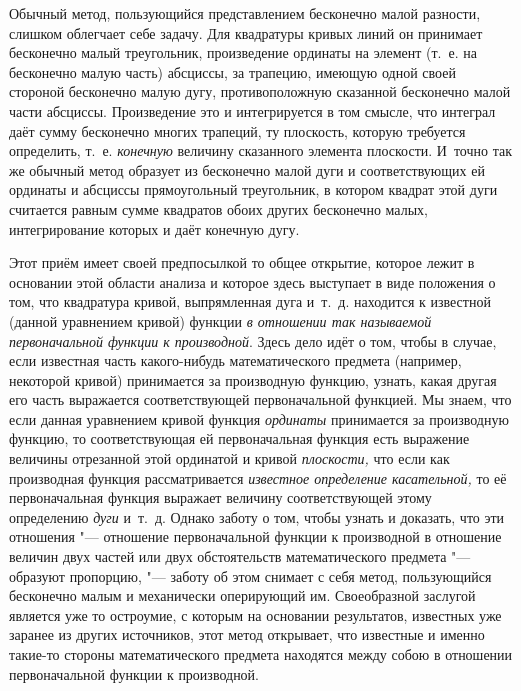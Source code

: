 Обычный метод, пользующийся представлением бесконечно малой разности, слишком
облегчает себе задачу. Для квадратуры кривых линий он принимает бесконечно
малый треугольник, произведение ординаты на элемент (т.~е. на бесконечно малую
часть) абсциссы, за трапецию, имеющую одной своей стороной бесконечно малую
дугу, противоположную сказанной бесконечно малой части абсциссы. Произведение
это и интегрируется в том смысле, что интеграл даёт сумму бесконечно многих
трапеций, ту плоскость, которую требуется определить, т.~е. {\em конечную}
величину сказанного элемента плоскости. И~точно так же обычный метод образует
из бесконечно малой дуги и соответствующих ей ординаты и абсциссы прямоугольный
треугольник, в котором квадрат этой дуги считается равным сумме квадратов обоих
других бесконечно малых, интегрирование которых и даёт конечную дугу.

Этот приём имеет своей предпосылкой то общее открытие, которое лежит в
основании этой области анализа и которое здесь выступает в виде положения о
том, что квадратура кривой, выпрямленная дуга и~т.~д. находится к известной
(данной уравнением кривой) функции {\em в отношении так называемой
первоначальной функции к производной}. Здесь дело идёт о том, чтобы в случае,
если известная часть какого-нибудь математического предмета (например,
некоторой кривой) принимается за производную функцию, узнать, какая другая его
часть выражается соответствующей первоначальной функцией. Мы знаем, что если
данная уравнением кривой функция {\em ординаты} принимается за производную
функцию, то соответствующая ей первоначальная функция есть выражение величины
отрезанной этой ординатой и кривой {\em плоскости,} что если как производная
функция рассматривается {\em известное определение касательной,} то её
первоначальная функция выражает величину соответствующей этому определению
{\em дуги} и~т.~д. Однако заботу о том, чтобы узнать и доказать, что эти
отношения "--- отношение первоначальной функции к производной в отношение
величин двух частей или двух обстоятельств математического предмета "---
образуют пропорцию, "--- заботу об этом снимает с себя метод, пользующийся
бесконечно малым и механически оперирующий им. Своеобразной заслугой является
уже то остроумие, с которым на основании результатов, известных уже заранее из
других источников, этот метод открывает, что известные и именно такие-то
стороны математического предмета находятся между собою в отношении
первоначальной функции к производной.


